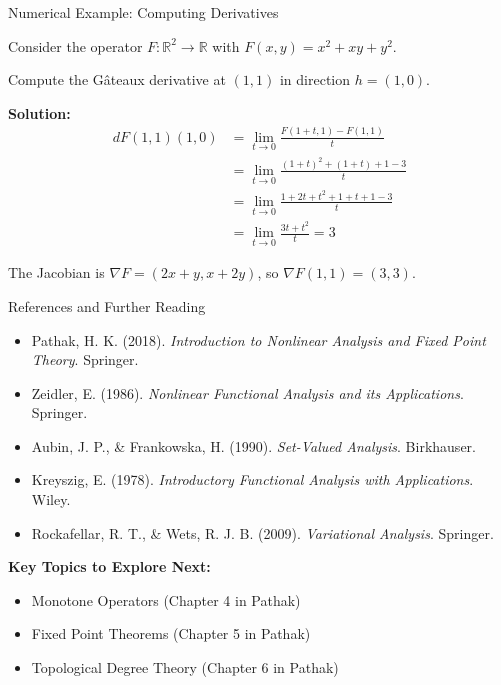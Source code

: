 \documentclass[aspectratio=169,10pt]{beamer}
\begin{document}
\begin{frame}{Numerical Example: Computing Derivatives}
  \begin{problem}
    Consider the operator $F: \mathbb{R}^2 \to \mathbb{R}$ with $F(x,y) = x^2 + xy + y^2$.

    Compute the Gâteaux derivative at $(1, 1)$ in direction $h = (1, 0)$.
  \end{problem}

  \textbf{Solution:}
  \[
    \begin{split}
      dF(1,1)(1,0) &= \lim_{t \to 0} \frac{F(1+t, 1) - F(1,1)}{t} \\
      &= \lim_{t \to 0} \frac{(1+t)^2 + (1+t) + 1 - 3}{t} \\
      &= \lim_{t \to 0} \frac{1 + 2t + t^2 + 1 + t + 1 - 3}{t} \\
      &= \lim_{t \to 0} \frac{3t + t^2}{t} = 3
    \end{split}
  \]

  The Jacobian is $\nabla F = (2x + y, x + 2y)$, so $\nabla F(1,1) = (3, 3)$.
\end{frame}

\begin{frame}[allowframebreaks]{References and Further Reading}
  \begin{itemize}
    \item Pathak, H. K. (2018). \textit{Introduction to Nonlinear Analysis and Fixed Point Theory}. Springer.

    \item Zeidler, E. (1986). \textit{Nonlinear Functional Analysis and its Applications}. Springer.

    \item Aubin, J. P., \& Frankowska, H. (1990). \textit{Set-Valued Analysis}. Birkhauser.

    \item Kreyszig, E. (1978). \textit{Introductory Functional Analysis with Applications}. Wiley.

    \item Rockafellar, R. T., \& Wets, R. J. B. (2009). \textit{Variational Analysis}. Springer.
  \end{itemize}

  \vspace{1cm}
  \textbf{Key Topics to Explore Next:}
  \begin{itemize}
    \item Monotone Operators (Chapter 4 in Pathak)
    \item Fixed Point Theorems (Chapter 5 in Pathak)
    \item Topological Degree Theory (Chapter 6 in Pathak)
  \end{itemize}
\end{frame}
\end{document}
